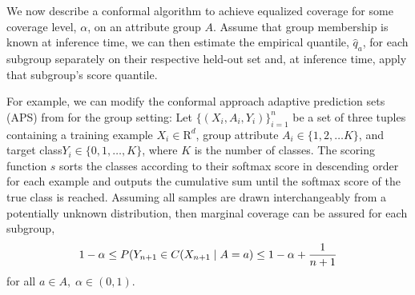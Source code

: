 \documentclass[letterpaper]{article} %
\begin{document}
    We now describe a conformal algorithm to achieve equalized coverage for some coverage level, $\alpha$, on an attribute group $A$. 
    Assume that group membership is known at inference time, we can then estimate the empirical quantile, $\hat{q}_a$, for each subgroup separately on their respective held-out set and, at inference time, apply that subgroup's score quantile. 
    
    For example, we can modify the conformal approach adaptive prediction sets (APS) from \citet{NEURIPS2020_244edd7e} for the group setting:
    Let $\{(X_i, A_i, Y_i)\}_{i=1}^n$ be a set of three tuples containing a training example $X_i \in \mathrm{R}^d$, group attribute $A_i \in \{1, 2, \ldots K\}$, and target class$Y_i \in \{0, 1, \ldots, K\}$, where $K$ is the number of classes.
    The scoring function $s$ sorts the classes according to their softmax score in descending order for each example and outputs the cumulative sum until the softmax score of the true class is reached.
    Assuming all samples are drawn interchangeably from a potentially unknown distribution, then marginal coverage can be assured for each subgroup, 
    \begin{equation}
        \small
        1 - \alpha \leq P(Y_{n+1} \in C(X_{n+1} \mid A = a) \leq 1 - \alpha + \frac{1}{n + 1}
    \end{equation}
    for all $a \in A, \; \alpha \in (0, 1)$.
     
    
\end{document}
